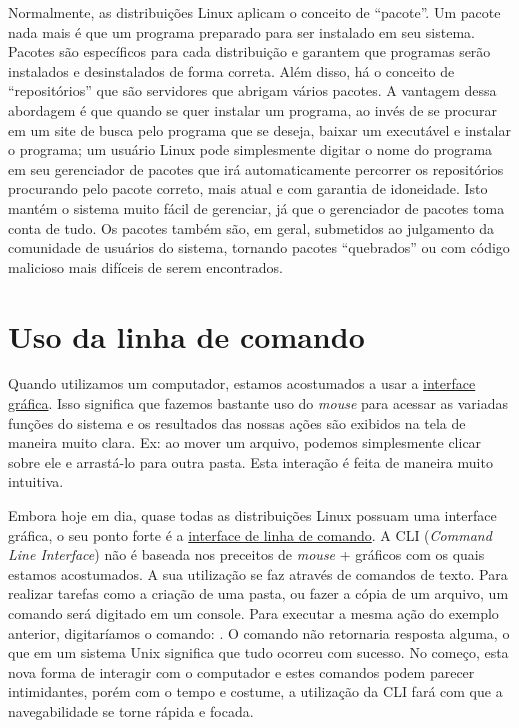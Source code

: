 \documentclass{handout_utfpr}
\newcommand{\com}[1]{
\colorbox{light-gray}{\texttt{\pbox{\textwidth}{\$ #1}}}
}
\begin{document}
Normalmente, as distribuições Linux aplicam o conceito de ``pacote''. Um pacote nada mais é que um programa preparado para ser instalado em seu sistema. Pacotes são específicos para cada distribuição e garantem que programas serão instalados e desinstalados de forma correta. Além disso, há o conceito de ``repositórios'' que são servidores que abrigam vários pacotes. A vantagem dessa abordagem é que quando se quer instalar um programa, ao invés de se procurar em um site de busca pelo programa que se deseja, baixar um executável e instalar o programa; um usuário Linux pode simplesmente digitar o nome do programa em seu gerenciador de pacotes que irá automaticamente percorrer os repositórios procurando pelo pacote correto, mais atual e com garantia de idoneidade. Isto mantém o sistema muito fácil de gerenciar, já que o gerenciador de pacotes toma conta de tudo. Os pacotes também são, em geral, submetidos ao julgamento da comunidade de usuários do sistema, tornando pacotes ``quebrados'' ou com código malicioso mais difíceis de serem encontrados.

\section{Uso da linha de comando}

Quando utilizamos um computador, estamos acostumados a usar a \underline{interface gráfica}. Isso significa que fazemos bastante uso do \textit{mouse} para acessar as variadas funções do sistema e os resultados das nossas ações são exibidos na tela de maneira muito clara. Ex: ao mover um arquivo, podemos simplesmente clicar sobre ele e arrastá-lo para outra pasta. Esta interação é feita de maneira muito intuitiva.

Embora hoje em dia, quase todas as distribuições Linux possuam uma interface gráfica, o seu ponto forte é a \underline{interface de linha de comando}. A CLI (\textit{Command Line Interface}) não é baseada nos preceitos de \textit{mouse} + gráficos com os quais estamos acostumados. A sua utilização se faz através de comandos de texto. Para realizar tarefas como a criação de uma pasta, ou fazer a cópia de um arquivo, um comando será digitado em um console. Para executar a mesma ação do exemplo anterior, digitaríamos o comando: \com{mv local\_arquivo local\_destino}. O comando não retornaria resposta alguma, o que em um sistema Unix significa que tudo ocorreu com sucesso. No começo, esta nova forma de interagir com o computador e estes comandos podem parecer intimidantes, porém com o tempo e costume, a utilização da CLI fará com que a navegabilidade se torne rápida e focada.
\end{document}

